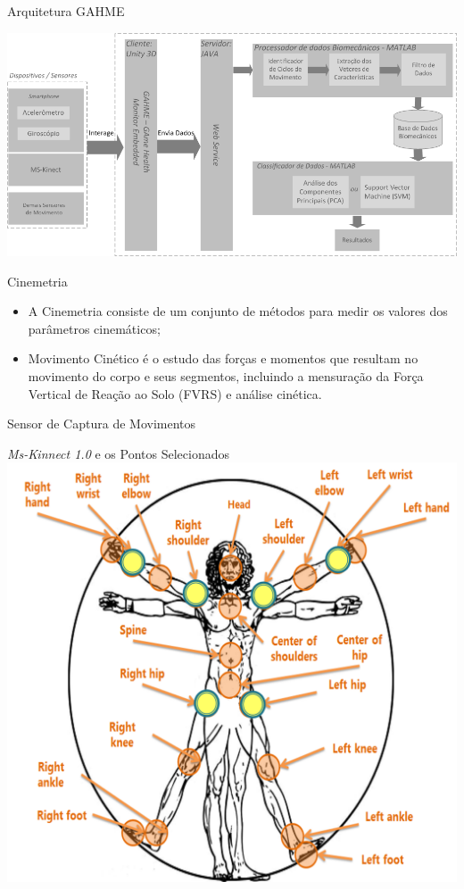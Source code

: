 \documentclass{beamer}
\begin{document}
\begin{frame}{Arquitetura GAHME}
  \begin{block}{}
      \center \includegraphics[height=2.0 in]{img/arquitetura.png}
  \end{block}
\end{frame}

\begin{frame}{Cinemetria}
  \begin{block}{}
      \begin{itemize}
				\item A Cinemetria consiste de um conjunto de métodos para medir os valores dos parâmetros cinemáticos;
				\item Movimento Cinético é o estudo das forças e momentos que resultam no movimento do corpo e seus segmentos, incluindo a mensuração da Força Vertical de Reação ao Solo (FVRS) e análise cinética.
			\end{itemize}
  \end{block}
\end{frame}

\begin{frame}{Sensor de Captura de Movimentos}
  \begin{block}{\textit{Ms-Kinnect 1.0} e os Pontos Selecionados}
      \center \includegraphics[height=2.6 in]{img/articulacoes-sel.png}
  \end{block}
\end{frame}
\end{document}
